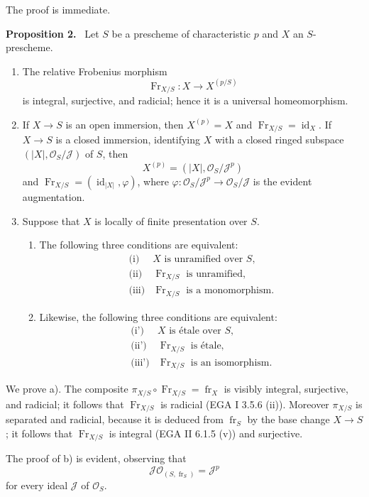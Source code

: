 \documentclass[11pt]{article}
\newenvironment{statement}[1]{\par\medskip\noindent\textbf{#1.}\ }{\par\medskip}
\providecommand{\OO}{\mathcal{O}}
\providecommand{\id}{\operatorname{id}}
\providecommand{\id}{\operatorname{id}}
\providecommand{\id}{\operatorname{id}}
\providecommand{\id}{\operatorname{id}}
\providecommand{\id}{\operatorname{id}}
\providecommand{\fr}{\operatorname{fr}}
\providecommand{\Fr}{\operatorname{Fr}}
\providecommand{\JJ}{\mathcal J}
\providecommand{\Fr}{\operatorname{Fr}}
\providecommand{\fr}{\operatorname{fr}}
\providecommand{\id}{\operatorname{id}}
\begin{document}
The proof is immediate.

\begin{statement}{Proposition 2}
Let $S$ be a prescheme of characteristic $p$ and $X$ an $S$-prescheme.
\begin{enumerate}[label=\alph*)]
\item The relative Frobenius morphism
\[
\Fr_{X/S}:X\longrightarrow X^{(p/S)}
\]
is integral, surjective, and radicial; hence it is a universal homeomorphism.

\item If $X\to S$ is an open immersion, then $X^{(p)}=X$ and $\Fr_{X/S}=\id_X$. If $X\to S$ is a closed immersion, identifying $X$ with a closed ringed subspace $(|X|,\OO_S/\JJ)$ of $S$, then
\[
X^{(p)}=(|X|,\OO_S/\JJ^p)
\]
and $\Fr_{X/S}=(\id_{|X|},\varphi)$, where $\varphi:\OO_S/\JJ^p\to\OO_S/\JJ$ is the evident augmentation.

\item Suppose that $X$ is locally of finite presentation over $S$.
\begin{enumerate}[label=\arabic*)]
\item The following three conditions are equivalent:
\[
\begin{array}{ll}
\text{(i)}& X\text{ is unramified over }S,\\
\text{(ii)}& \Fr_{X/S}\text{ is unramified},\\
\text{(iii)}& \Fr_{X/S}\text{ is a monomorphism}.
\end{array}
\]
\item Likewise, the following three conditions are equivalent:
\[
\begin{array}{ll}
\text{(i')}& X\text{ is étale over }S,\\
\text{(ii')}& \Fr_{X/S}\text{ is étale},\\
\text{(iii')}& \Fr_{X/S}\text{ is an isomorphism}.
\end{array}
\]
\end{enumerate}
\end{enumerate}
\end{statement}

We prove a). The composite $\pi_{X/S}\circ\Fr_{X/S}=\fr_X$ is visibly integral, surjective, and radicial; it follows that $\Fr_{X/S}$ is radicial (EGA I 3.5.6 (ii)). Moreover $\pi_{X/S}$ is separated and radicial, because it is deduced from $\fr_S$ by the base change $X\to S$; it follows that $\Fr_{X/S}$ is integral (EGA II 6.1.5 (v)) and surjective.

The proof of b) is evident, observing that
\[
\JJ\OO_{(S,\fr_S)}=\JJ^p
\]
for every ideal $\JJ$ of $\OO_S$.
\end{document}
